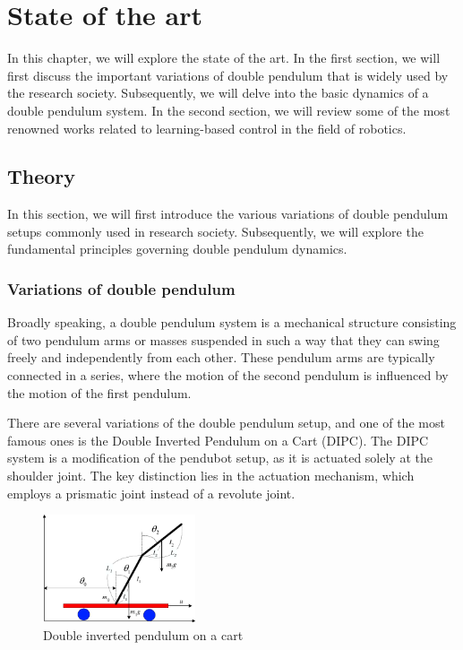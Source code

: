 \chapter{State of the art}
In this chapter, we will explore the state of the art. In the first section, we  will first discuss the important variations of double pendulum that is widely used by the research society. Subsequently, we will delve into the basic dynamics of a double pendulum system. In the second section, we will review some of the most renowned works related to learning-based control in the field of robotics.

\section{Theory}
In this section, we will first introduce the various variations of double pendulum setups commonly used in research society. Subsequently, we will explore the fundamental principles governing double pendulum dynamics.

\subsection{Variations of double pendulum}
Broadly speaking, a double pendulum system is a mechanical structure consisting of two pendulum arms or masses suspended in such a way that they can swing freely and independently from each other. These pendulum arms are typically connected in a series, where the motion of the second pendulum is influenced by the motion of the first pendulum.

There are several variations of the double pendulum setup, and one of the most famous ones is the Double Inverted Pendulum on a Cart (DIPC)\cite{bogdanov2004optimal}. The DIPC system is a modification of the pendubot setup, as it is actuated solely at the shoulder joint. The key distinction lies in the actuation mechanism, which employs a prismatic joint instead of a revolute joint.

\begin{figure}[H]
  \centering
  \includegraphics[width=0.4\textwidth]{figures/Double-inverted-pendulum-on-a-cart.png} %
  \caption{Double inverted pendulum on a cart\cite{bogdanov2004optimal}}
  \label{fig:DIPC}
\end{figure}

